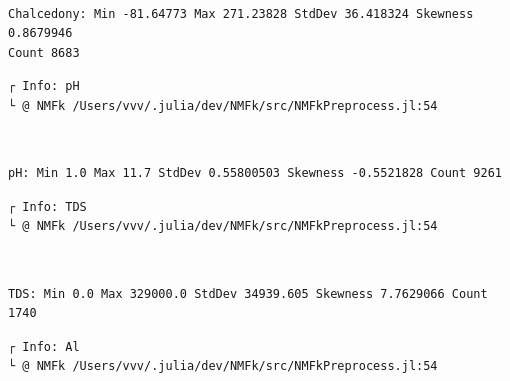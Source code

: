 \documentclass[11pt]{article}
\begin{document}
    \begin{center}
    \end{center}
    { \hspace*{\fill} \\}
    
    \begin{Verbatim}[commandchars=\\\{\}]
Chalcedony: Min -81.64773 Max 271.23828 StdDev 36.418324 Skewness 0.8679946
Count 8683
    \end{Verbatim}

    \begin{Verbatim}[commandchars=\\\{\}]
┌ Info: pH
└ @ NMFk /Users/vvv/.julia/dev/NMFk/src/NMFkPreprocess.jl:54
    \end{Verbatim}

    \begin{center}
    \end{center}
    { \hspace*{\fill} \\}
    
    \begin{Verbatim}[commandchars=\\\{\}]
pH: Min 1.0 Max 11.7 StdDev 0.55800503 Skewness -0.5521828 Count 9261
    \end{Verbatim}

    \begin{Verbatim}[commandchars=\\\{\}]
┌ Info: TDS
└ @ NMFk /Users/vvv/.julia/dev/NMFk/src/NMFkPreprocess.jl:54
    \end{Verbatim}

    \begin{center}
    \end{center}
    { \hspace*{\fill} \\}
    
    \begin{Verbatim}[commandchars=\\\{\}]
TDS: Min 0.0 Max 329000.0 StdDev 34939.605 Skewness 7.7629066 Count 1740
    \end{Verbatim}

    \begin{Verbatim}[commandchars=\\\{\}]
┌ Info: Al
└ @ NMFk /Users/vvv/.julia/dev/NMFk/src/NMFkPreprocess.jl:54
    \end{Verbatim}
\end{document}
